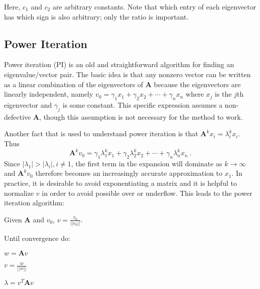 \documentclass[12pt]{article}
\newcommand{\ve}[1]{\ensuremath{\mathbf{#1}}}
\begin{document}
Here, $c_1$ and $c_2$ are arbitrary constants. Note that which entry of each
eigenvector has which sign is also arbitrary; only the ratio is important.

\subsection*{Power Iteration}
Power iteration (PI) is an old and straightforward algorithm for finding an eigenvalue/vector pair. The basic idea is that any nonzero vector can be written as a linear combination of the eigenvectors of $\ve{A}$ because the eigenvectors are linearly independent, namely $v_0 = \gamma_1 x_1 + \gamma_2 x_2 + \cdots + \gamma_n x_n$ where $x_{j}$ is the $j$th eigenvector and $\gamma_{j}$ is some constant. This specific expression assumes a non-defective $\ve{A}$, though this assumption is not necessary for the method to work. 

Another fact that is used to understand power iteration is that $\ve{A}^k x_i = \lambda_i^k x_i$. Thus
%
\begin{equation}
  \ve{A}^k v_{0} = \gamma_1 \lambda_1^k x_1 + \gamma_2 \lambda_2^k x_2 + \cdots + \gamma_n \lambda_n^k x_n \:.
  \label{eq:Ak}
\end{equation}
%
Since $|\lambda_1| > |\lambda_i|, i \ne 1$, the first term in the expansion will dominate as $k \to \infty$ and $\ve{A}^k v_{0}$ therefore becomes an increasingly accurate approximation to $x_1$. In practice, it is desirable to avoid exponentiating a matrix and it is helpful to normalize $v$ in order to avoid possible over or underflow. This leads to the power iteration algorithm:%
\pagebreak
%
\begin{list}{}{}
  \item Given $\ve{A}$ and $v_0$, $v = \frac{v_{0}}{||v_{0}||}$.
  \item Until convergence do:
  \begin{list}{}{\hspace{2em}}
    \item $w = \ve{A}v$
    \item $v = \frac{w}{||w||}$
    \item $\lambda = v^{T}\ve{A}v$
  \end{list}
\end{list}
\end{document}
